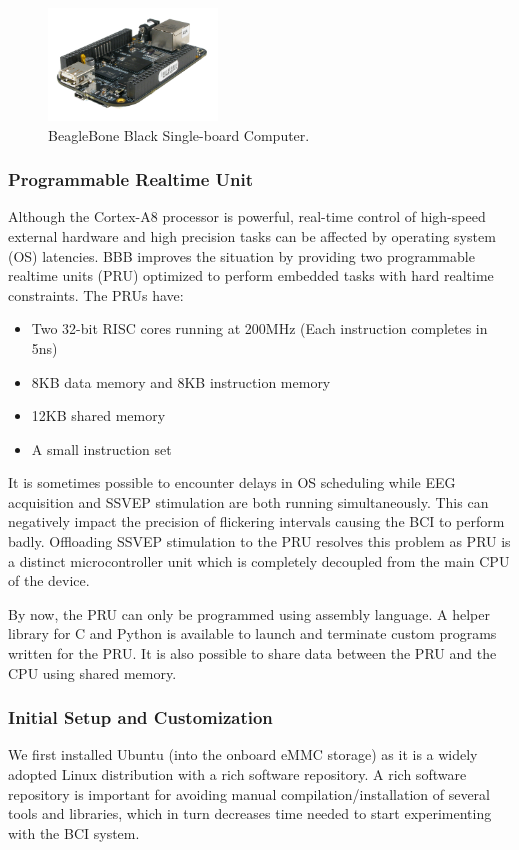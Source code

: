\documentclass[12pt]{article}
\newcommand\mysubsubsection[1]{\subsubsection{#1}}
\numberwithin{equation}{section}
\numberwithin{figure}{section}
\numberwithin{table}{section}
\begin{document}
\begin{figure}[ht]
    \centering
    \includegraphics[width=0.4\textwidth]{images/bbb}
    \caption{BeagleBone Black Single-board Computer.}
    \label{fig:bbb}
\end{figure}

\mysubsubsection{Programmable Realtime Unit}\label{seq:embeddedcomputer_bbb_pru}
\par{
    Although the Cortex-A8 processor is powerful, real-time control of high-speed external hardware
    and high precision tasks can be affected by operating system (OS) latencies. BBB improves the
    situation by providing two programmable realtime units (PRU) optimized to perform embedded tasks
    with hard realtime constraints. The PRUs have:
    \begin{itemize}
        \item Two 32-bit RISC cores running at 200MHz (Each instruction completes in 5ns)
        \item 8KB data memory and 8KB instruction memory
        \item 12KB shared memory
        \item A small instruction set
    \end{itemize}
    It is sometimes possible to encounter delays in OS scheduling while EEG
    acquisition and SSVEP stimulation are both running simultaneously. This can negatively
    impact the precision of flickering intervals causing the BCI to perform badly.
    Offloading SSVEP stimulation to the PRU resolves this problem as PRU is a distinct
    microcontroller unit which is completely decoupled from the main CPU of the device.
}
\par{
    By now, the PRU can only be programmed using assembly language. A helper library
    for C and Python is available to launch and terminate custom programs written for the PRU.
    It is also possible to share data between the PRU and the CPU using shared memory.
}

\mysubsubsection{Initial Setup and Customization}\label{seq:embeddedcomputer_initialsetup}
\par{
We first installed Ubuntu (into the onboard eMMC storage) as it is a widely adopted Linux distribution with a rich software repository. A rich software repository is important for avoiding 
manual compilation/installation of several tools and libraries, which in turn decreases time needed to start experimenting with the BCI system.
}
\end{document}

